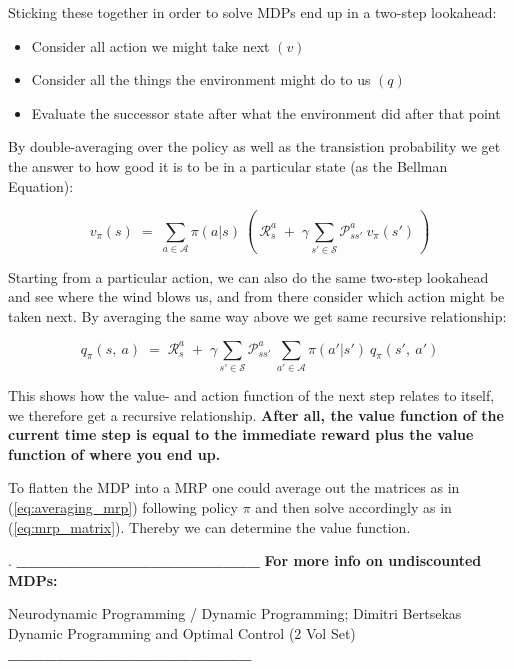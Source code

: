 \documentclass[10pt]{article}
\begin{document}
Sticking these together in order to solve MDPs end up in a two-step lookahead:
\begin{itemize}
\item Consider all action we might take next $(v)$
\item Consider all the things the environment might do to us $(q)$
\item Evaluate the successor state after what the environment did after that point
\end{itemize}

By double-averaging over the policy as well as the transistion probability we get the answer to how good it is to be in a particular state (as the Bellman Equation):

\begin{equation}
v_{\pi}(s)\;=\;\sum_{a \in \mathcal{A}} \pi(a|s)\: \left( \: \mathcal{R}_{s}^{a}\;+\;\gamma \sum_{s' \in \mathcal{S}} \mathcal{P}_{ss'}^{a}\:v_{\pi}(s') \: \right)
\label{eq:v_pi_be}
\end{equation}

Starting from a particular action, we can also do the same two-step lookahead and see where the wind blows us, and from there consider which action might be taken next. By averaging the same way above we get same recursive relationship:

\begin{equation}
q_{\pi}(s,\:a)\;=\;\mathcal{R}_{s}^{a}\;+\;\gamma \sum_{s' \in \mathcal{S}} \mathcal{P}_{ss'}^{a}\: \sum_{a' \in \mathcal{A}} \pi(a'|s')\:q_{\pi}(s',\:a')
\end{equation}

This shows how the value- and action function of the next step relates to itself, we therefore get a recursive relationship. \textbf{After  all, the value function of the current time step is equal to the immediate reward plus the value function of where you end up.}


To flatten the MDP into a MRP one could average out the matrices as in (\ref{eq:averaging_mrp}) following policy $\pi$ and then solve accordingly as in (\ref{eq:mrp_matrix}). Thereby we can determine the value function.

.\newline
\textbf{\_\_\_\_\_\_\_\_\_\_\_\_\_\_\_\_\_\_\_\_}
\textbf{For more info on undiscounted MDPs:}

Neurodynamic Programming / Dynamic Programming;
Dimitri Bertsekas Dynamic Programming and Optimal Control (2 Vol Set)
\textbf{\_\_\_\_\_\_\_\_\_\_\_\_\_\_\_\_\_\_\_\_} \newline
\end{document}
